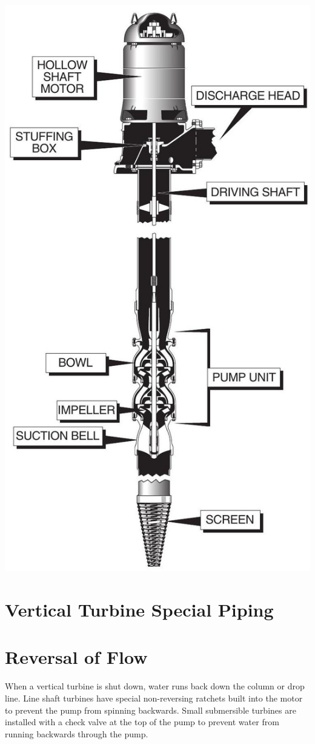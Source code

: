 \documentclass[10pt]{article}
\begin{document}
\includegraphics[max width=\textwidth]{VerticalTurbinePumpComponents}

\section{Vertical Turbine Special Piping}
\section{Reversal of Flow}
When a vertical turbine is shut down, water runs back down the column or drop line. Line shaft turbines have special non-reversing ratchets built into the motor to prevent the pump from spinning backwards. Small submersible turbines are installed with a check valve at the top of the pump to prevent water from running backwards through the pump.
\end{document}
